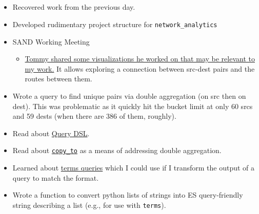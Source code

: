 \documentclass{weeklyreport}
\begin{document}
\subsection*{}

\begin{itemize}
	\item Recovered work from the previous day.
	\item Developed rudimentary project structure for \texttt{network\_analytics}
	\item SAND Working Meeting
	\begin{itemize}
		\item \href{https://atlas-kibana.mwt2.org:5601/s/networking/app/kibana#/dashboard/35976890-d8ca-11ea-9344-2da4788d78a4?_g=(filters:!(),refreshInterval:(pause:!t,value:0),time:(from:now-15m,to:now))&_a=(description:'This%20dashboard%20allows%20for%20the%20user%20to%20select%20both%20the%20source%20host,%20as%20well%20as%20any%20destination%20it%20may%20apply%20to,%20so%20to%20give%20all%20of%20the%20relevant%20information%20about%20the%20given%20parameters.%20This%20dashboard%20primarily%20focuses%20on%20the%20trace.',filters:!(('$state':(store:appState),meta:(alias:!n,disabled:!f,index:'45542740-0065-11e8-8f2f-ab6704660c79',key:src_host,negate:!f,params:(query:mwt2-ps02.campuscluster.illinois.edu),type:phrase),query:(match_phrase:(src_host:mwt2-ps02.campuscluster.illinois.edu)))),fullScreenMode:!f,options:(hidePanelTitles:!f,useMargins:!t),query:(language:kuery,query:''),timeRestore:!f,title:'Site-Based%20perfsonar%20Trace%20Breakdown%20ts-ih',viewMode:view)}{Tommy shared some visualizations he worked on that may be relevant to my work.} It allows exploring a connection between src-dest pairs and the routes between them.
	\end{itemize}
	\item Wrote a query to find unique pairs via double aggregation (on src then on dest). This was problematic as it quickly hit the bucket limit at only 60 srcs and 59 dests (when there are 386 of them, roughly).
	\item Read about \href{https://www.elastic.co/guide/en/elasticsearch/reference/current/query-dsl.html}{Query DSL}.
	\item Read about \href{https://www.elastic.co/guide/en/elasticsearch/reference/current/copy-to.html}{\texttt{copy\_to}} as a means of addressing double aggregation.
	\item Learned about \href{https://www.elastic.co/guide/en/elasticsearch/reference/current/query-dsl-terms-query.html}{terms queries} which I could use if I transform the output of a query to match the format.
	\item Wrote a function to convert python lists of strings into ES query-friendly string describing a list (e.g., for use with \texttt{terms}).
\end{itemize}
\end{document}
